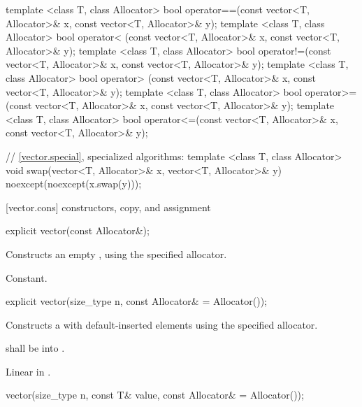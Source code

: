 \begin{codeblock}
{  template <class T, class Allocator>
    bool operator==(const vector<T, Allocator>& x, const vector<T, Allocator>& y);
  template <class T, class Allocator>
    bool operator< (const vector<T, Allocator>& x, const vector<T, Allocator>& y);
  template <class T, class Allocator>
    bool operator!=(const vector<T, Allocator>& x, const vector<T, Allocator>& y);
  template <class T, class Allocator>
    bool operator> (const vector<T, Allocator>& x, const vector<T, Allocator>& y);
  template <class T, class Allocator>
    bool operator>=(const vector<T, Allocator>& x, const vector<T, Allocator>& y);
  template <class T, class Allocator>
    bool operator<=(const vector<T, Allocator>& x, const vector<T, Allocator>& y);

  // \ref{vector.special}, specialized algorithms:
  template <class T, class Allocator>
    void swap(vector<T, Allocator>& x, vector<T, Allocator>& y)
      noexcept(noexcept(x.swap(y)));
}
\end{codeblock}%
%

[vector.cons]{ constructors, copy, and assignment}

\begin{itemdecl}
explicit vector(const Allocator&);
\end{itemdecl}

\begin{itemdescr}
\pnum
\effects Constructs an empty , using the
specified allocator.

\pnum
\complexity Constant.
\end{itemdescr}

\begin{itemdecl}
explicit vector(size_type n, const Allocator& = Allocator());
\end{itemdecl}

\begin{itemdescr}
\pnum
\effects Constructs a  with 
default-inserted elements using the specified allocator.

\pnum
\requires {} shall be  into .

\pnum
\complexity Linear in .
\end{itemdescr}

\begin{itemdecl}
vector(size_type n, const T& value,
       const Allocator& = Allocator());
\end{itemdecl}

